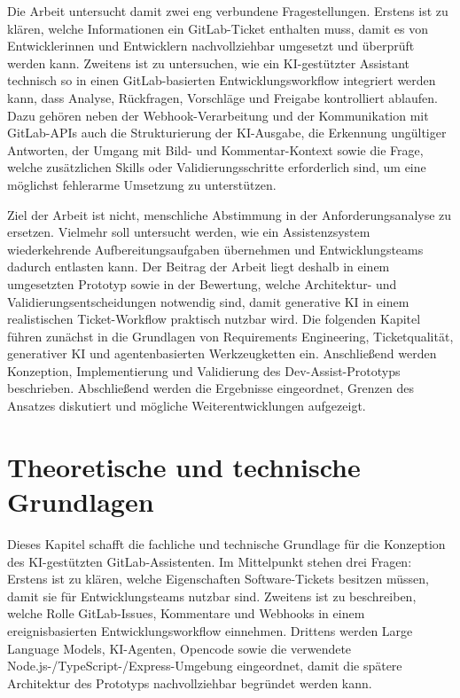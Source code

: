 \documentclass[12pt,a4paper,oneside]{scrreprt}
\begin{document}
Die Arbeit untersucht damit zwei eng verbundene Fragestellungen. Erstens ist zu klären, welche Informationen ein GitLab-Ticket enthalten muss, damit es von Entwicklerinnen und Entwicklern nachvollziehbar umgesetzt und überprüft werden kann. Zweitens ist zu untersuchen, wie ein KI-gestützter Assistant technisch so in einen GitLab-basierten Entwicklungsworkflow integriert werden kann, dass Analyse, Rückfragen, Vorschläge und Freigabe kontrolliert ablaufen. Dazu gehören neben der Webhook-Verarbeitung und der Kommunikation mit GitLab-APIs auch die Strukturierung der KI-Ausgabe, die Erkennung ungültiger Antworten, der Umgang mit Bild- und Kommentar-Kontext sowie die Frage, welche zusätzlichen Skills oder Validierungsschritte erforderlich sind, um eine möglichst fehlerarme Umsetzung zu unterstützen.

Ziel der Arbeit ist nicht, menschliche Abstimmung in der Anforderungsanalyse zu ersetzen. Vielmehr soll untersucht werden, wie ein Assistenzsystem wiederkehrende Aufbereitungsaufgaben übernehmen und Entwicklungsteams dadurch entlasten kann. Der Beitrag der Arbeit liegt deshalb in einem umgesetzten Prototyp sowie in der Bewertung, welche Architektur- und Validierungsentscheidungen notwendig sind, damit generative KI in einem realistischen Ticket-Workflow praktisch nutzbar wird. Die folgenden Kapitel führen zunächst in die Grundlagen von Requirements Engineering, Ticketqualität, generativer KI und agentenbasierten Werkzeugketten ein. Anschließend werden Konzeption, Implementierung und Validierung des Dev-Assist-Prototyps beschrieben. Abschließend werden die Ergebnisse eingeordnet, Grenzen des Ansatzes diskutiert und mögliche Weiterentwicklungen aufgezeigt.

\chapter{Theoretische und technische Grundlagen}

Dieses Kapitel schafft die fachliche und technische Grundlage für die Konzeption des KI-gestützten GitLab-Assistenten. Im Mittelpunkt stehen drei Fragen: Erstens ist zu klären, welche Eigenschaften Software-Tickets besitzen müssen, damit sie für Entwicklungsteams nutzbar sind. Zweitens ist zu beschreiben, welche Rolle GitLab-Issues, Kommentare und Webhooks in einem ereignisbasierten Entwicklungsworkflow einnehmen. Drittens werden Large Language Models, KI-Agenten, Opencode sowie die verwendete Node.js-/TypeScript-/Express-Umgebung eingeordnet, damit die spätere Architektur des Prototyps nachvollziehbar begründet werden kann.
\end{document}
